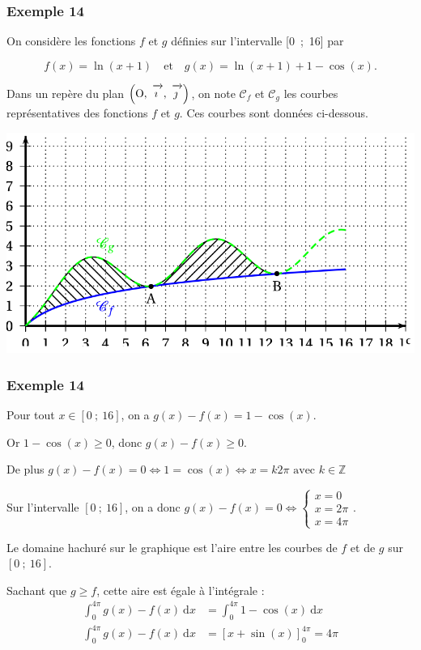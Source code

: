 \documentclass[11pt, hyperref={urlcolor=red,%
            linkcolor=blue, %
            colorlinks=true}]{beamer}
\newcommand{\Z}{\mathbb{Z}}
\newcommand{\dx}{\ensuremath{\text{d}x}}		%
\newcommand{\integralex}[3]{\int_{#1}^{#2} #3 \ \dx}
\def\Oij{\ensuremath{\left(\text{O},~\vect{\imath},~\vect{\jmath}\right)}}
\newcommand{\vect}[1]{\mathchoice%
{\overrightarrow{\displaystyle\mathstrut#1\,\,}}%
{\overrightarrow{\textstyle\mathstrut#1\,\,}}%
{\overrightarrow{\scriptstyle\mathstrut#1\,\,}}%
{\overrightarrow{\scriptscriptstyle\mathstrut#1\,\,}}}
\begin{document}
\begin{frame}
\frametitle{Exemple  14}
\label{exemple14}
On considère les fonctions $f$ et $g$ définies sur l'intervalle [0~;~16] par

\[f(x) = \ln(x + 1)\quad  \text{et}\quad g(x) = \ln(x + 1) + 1 - \cos(x).\]

Dans un repère du plan \Oij, on note $\mathcal{C}_f$ et $\mathcal{C}_g$ les courbes représentatives des fonctions $f$ et $g$. Ces courbes sont données  ci-dessous.


\begin{center}
\includegraphics[scale=0.2]{images/exemple14.png}
\end{center}
\end{frame}



\begin{frame}
\frametitle{Exemple  14}

Pour tout  $x \in [0~;~16]$, on a $g(x)-f(x) =  1 - \cos(x)$.

 Or $1-\cos(x) \geqslant 0$, donc $g(x)-f(x)\geqslant 0$.

 De plus  $g(x)-f(x) = 0 \Leftrightarrow 1 = \cos(x) \Leftrightarrow x = k2\pi \text{ avec } k \in \Z$

Sur l'intervalle $[0~;~16]$, on a donc $g(x)-f(x) = 0 \Leftrightarrow \begin{cases} x = 0 \\ x = 2 \pi \\ x = 4 \pi \end{cases}$.

Le domaine hachuré sur le graphique est l'aire entre les courbes de $f$ et de $g$ sur $[0~;~16]$.

Sachant que $g \geqslant f$, cette aire est égale à l'intégrale :
\pause \begin{align*}
\integralex{0}{4\pi}{g(x)-f(x)} &=\integralex{0}{4\pi}{1-\cos(x)}\\
 \integralex{0}{4\pi}{g(x)-f(x)} &=\left[x+\sin(x)\right]_{0}^{4\pi} = 4\pi
\end{align*}

\end{frame}
\end{document}
